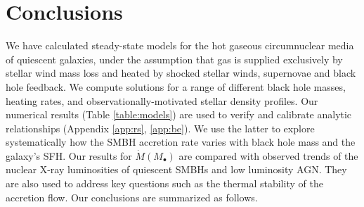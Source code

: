 \documentclass[usenatbib,fleqn]{mn2e}
\newcommand{\Mbh}[1][]{M_{\bullet#1}}
\begin{document}




\section{Conclusions}
\label{sec:conclusions}

We have calculated steady-state models for the hot gaseous
circumnuclear media of quiescent galaxies, under the assumption that
gas is supplied exclusively by stellar wind mass loss and heated by
shocked stellar winds, supernovae and black hole feedback.  We compute
solutions for a range of different black hole masses, heating rates,
and observationally-motivated stellar density profiles.  Our numerical
results (Table \ref{table:models}) are used to verify and calibrate
analytic relationships (Appendix \ref{app:rs}, \ref{app:be}).  We use
the latter to explore systematically how the SMBH accretion rate
varies with black hole mass and the galaxy's SFH.  Our results for
$\dot{M}(\Mbh)$ are compared with observed trends of the nuclear X-ray
luminosities of quiescent SMBHs and low luminosity AGN.  They are also
used to address key questions such as the thermal stability of the
accretion flow.  Our conclusions are summarized as follows.
\end{document}
